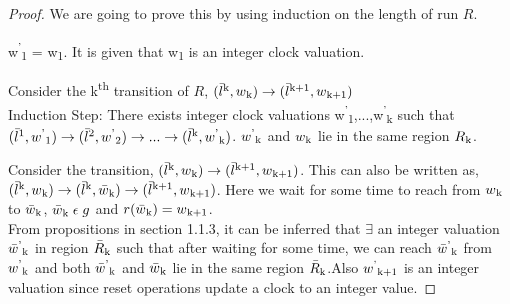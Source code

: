 \documentclass[12pt,letterpaper]{report}
\begin{document}
\begin{proof}
We are going to prove this by using induction on the length of run $R$.
\\
\par
w\textsuperscript{'}\textsubscript{1} = w\textsubscript{1}. It is given that w\textsubscript{1} is an integer clock valuation.
\\
\par
\indent Consider the k\textsuperscript{th} transition of $R$, $(\bar{l} \textsuperscript{k},w\textsubscript{k}) \rightarrow (\bar{l} \textsuperscript{k+1},w\textsubscript{k+1})$
\\Induction Step: There exists integer clock valuations w\textsuperscript{'}\textsubscript{1},...,w\textsuperscript{'}\textsubscript{k} such that $(\bar{l} \textsuperscript{1},w\textsuperscript{'}\textsubscript{1}) \rightarrow (\bar{l} \textsuperscript{2},w\textsuperscript{'}\textsubscript{2}) \rightarrow ... \rightarrow (\bar{l} \textsuperscript{k},w\textsuperscript{'}\textsubscript{k})$. $w\textsuperscript{'}\textsubscript{k}$ and $w\textsubscript{k}$ lie in the same region $R\textsubscript{k}$.  
\par
Consider the transition, $(\bar{l} \textsuperscript{k},w\textsubscript{k}) \rightarrow (\bar{l} \textsuperscript{k+1},w\textsubscript{k+1})$.
This can also be written as, $(\bar{l} \textsuperscript{k},w\textsubscript{k}) \rightarrow (\bar{l} \textsuperscript{k},\bar{w}\textsubscript{k}) \rightarrow (\bar{l} \textsuperscript{k+1},w\textsubscript{k+1})$. Here we wait for some time to reach from $w\textsubscript{k}$ to  $\bar{w}\textsubscript{k}$, $\bar{w}\textsubscript{k}\; \epsilon \; g$ and $r(\bar{w}\textsubscript{k}) = w\textsubscript{k+1}$.
\\
From propositions in section 1.1.3, it can be inferred that $\exists$ an integer valuation $\bar{w}\textsuperscript{'}\textsubscript{k}$ in region $\bar{R}\textsubscript{k}$ such that after waiting for some time, we can reach $\bar{w}\textsuperscript{'}\textsubscript{k}$ from $w\textsuperscript{'}\textsubscript{k}$ and both $\bar{w}\textsuperscript{'}\textsubscript{k}$ and $\bar{w}\textsubscript{k}$ lie in the same region $\bar{R}\textsubscript{k}$.Also $w\textsuperscript{'}\textsubscript{k+1}$ is an integer valuation since reset operations update a clock to an integer value.  

\end{proof}
\end{document}
